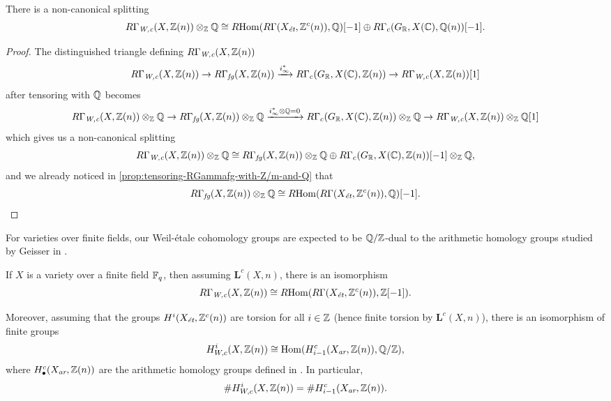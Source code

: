 \documentclass{article}
\numberwithin{equation}{section}
\begin{document}
\begin{proposition}
  There is a non-canonical splitting
  \[ R\Gamma_\Wc (X, \ZZ(n)) \otimes_\ZZ \QQ \cong
    \RHom (R\Gamma (X_\et, \ZZ^c (n)), \QQ) [-1] \oplus
    R\Gamma_c (G_\RR, X (\CC), \QQ (n)) [-1]. \]

  \begin{proof}
    The distinguished triangle defining $R\Gamma_\Wc (X, \ZZ(n))$
    \[ R\Gamma_\Wc (X, \ZZ (n)) \to
      R\Gamma_\fg (X, \ZZ(n)) \xrightarrow{i_\infty^*}
      R\Gamma_c (G_\RR, X (\CC), \ZZ(n)) \to
      R\Gamma_\Wc (X, \ZZ (n)) [1] \]
    after tensoring with $\QQ$ becomes
    \[ R\Gamma_\Wc (X, \ZZ (n))\otimes_\ZZ \QQ \to
      R\Gamma_\fg (X, \ZZ(n))\otimes_\ZZ \QQ \xrightarrow{i_\infty^*\otimes\QQ = 0}
      R\Gamma_c (G_\RR, X (\CC), \ZZ(n))\otimes_\ZZ \QQ \to
      R\Gamma_\Wc (X, \ZZ (n))\otimes_\ZZ \QQ [1] \]
    which gives us a non-canonical splitting
    \cite[Chapitre~II, Corollaire~1.2.6]{Verdier-thesis}
    \[ R\Gamma_\Wc (X, \ZZ (n))\otimes_\ZZ \QQ \cong
      R\Gamma_\fg (X, \ZZ(n))\otimes_\ZZ \QQ \oplus
      R\Gamma_c (G_\RR, X (\CC), \ZZ(n)) [-1]\otimes_\ZZ \QQ, \]
    and we already noticed in \ref{prop:tensoring-RGammafg-with-Z/m-and-Q} that
    \[ R\Gamma_\fg (X, \ZZ (n)) \otimes_\ZZ \QQ \cong
      \RHom (R\Gamma (X_\et, \ZZ^c (n)), \QQ) [-1]. \qedhere \]
  \end{proof}
\end{proposition}

For varieties over finite fields, our Weil-étale cohomology groups are expected
to be $\QQ/\ZZ$-dual to the arithmetic homology groups studied by Geisser in
\cite{Geisser-2010-arithmetic-homology}.

\begin{proposition}
  If $X$ is a variety over a finite field $\FF_q$, then assuming
  $\mathbf{L}^c (X,n)$, there is an isomorphism
  \begin{equation}
    \label{eqn:RGamma-Wc-over-finite-fields}
    R\Gamma_\Wc (X,\ZZ(n)) \cong \RHom (R\Gamma (X_\et, \ZZ^c (n)), \ZZ [-1]).
  \end{equation}

  Moreover, assuming that the groups $H^i (X_\et, \ZZ^c (n))$ are torsion
  for all $i \in \ZZ$ (hence finite torsion by $\mathbf{L}^c (X,n)$),
  there is an isomorphism of finite groups
  $$H^i_{W,c} (X, \ZZ (n)) \cong \Hom (H_{i-1}^c (X_\ar, \ZZ (n)), \QQ/\ZZ),$$
  where $H_\bullet^c (X_\ar, \ZZ (n))$ are the arithmetic homology groups
  defined in \cite[\S 3]{Geisser-2010-arithmetic-homology}. In particular,
  $$\# H^i_{W,c} (X, \ZZ (n)) = \# H_{i-1}^c (X_\ar, \ZZ (n)).$$
\end{proposition}
\end{document}

